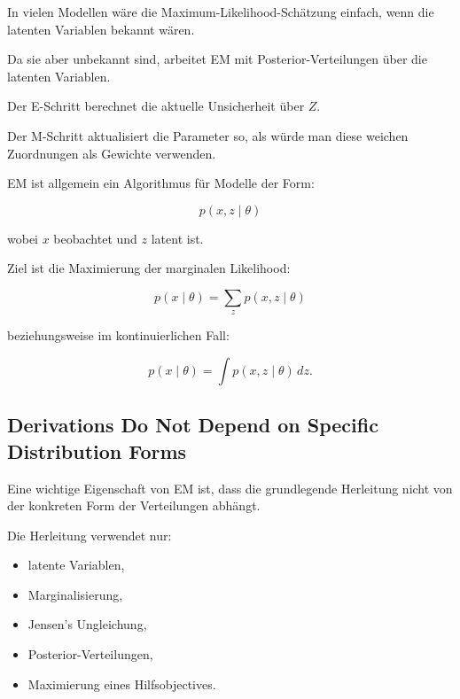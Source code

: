 \documentclass[11pt,a4paper]{scrartcl}
\begin{document}
\begin{solutionbox}
    In vielen Modellen wäre die Maximum-Likelihood-Schätzung einfach, wenn die
    latenten Variablen bekannt wären.

    Da sie aber unbekannt sind, arbeitet EM mit Posterior-Verteilungen über die
    latenten Variablen.

    Der E-Schritt berechnet die aktuelle Unsicherheit über \(Z\).

    Der M-Schritt aktualisiert die Parameter so, als würde man diese weichen
    Zuordnungen als Gewichte verwenden.
\end{solutionbox}

\begin{answerbox}
    EM ist allgemein ein Algorithmus für Modelle der Form:

    \[
        \boxed{
            p(x,z\mid \theta)
        }
    \]

    wobei \(x\) beobachtet und \(z\) latent ist.

    Ziel ist die Maximierung der marginalen Likelihood:

    \[
        \boxed{
            p(x\mid \theta)
            =
            \sum_z p(x,z\mid \theta)
        }
    \]

    beziehungsweise im kontinuierlichen Fall:

    \[
        \boxed{
            p(x\mid \theta)
            =
            \int p(x,z\mid \theta)\,dz.
        }
    \]
\end{answerbox}

\subsection{Derivations Do Not Depend on Specific Distribution Forms}

\begin{notebox}
    Eine wichtige Eigenschaft von EM ist, dass die grundlegende Herleitung nicht
    von der konkreten Form der Verteilungen abhängt.

    Die Herleitung verwendet nur:

    \begin{itemize}
        \item latente Variablen,
        \item Marginalisierung,
        \item Jensen's Ungleichung,
        \item Posterior-Verteilungen,
        \item Maximierung eines Hilfsobjectives.
    \end{itemize}
\end{notebox}
\end{document}
